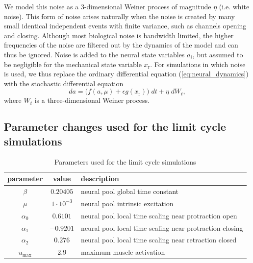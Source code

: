 We model this noise as a 3-dimensional Weiner process of magnitude $\eta$
(i.e. white noise).  This form of noise arises naturally when the noise is
created by many small identical independent events with finite variance,
such as channels opening and closing.  Although most biological noise is
bandwidth limited, the higher frequencies of the noise are filtered out by the
dynamics of the model and can thus be ignored.  Noise is added to the
neural state variables $a_i$, but assumed to be negligible for the mechanical
state variable $x_\textrm{r}$.  For simulations in which noise is used, we thus replace
the ordinary differential equation (\ref{eq:neural_dynamics}) with the stochastic
differential equation
\begin{equation}
\label{eq:noisy_neural_dynamics}
da = \bigl(f(a, \mu) + \epsilon g(x_\textrm{r})\bigr)\;dt + \eta\;dW_t,
\end{equation}
where $W_t$ is a three-dimensional Weiner process.

\subsection{Parameter changes used for the limit cycle simulations}

\ifthesis
\desccolwidth=100mm
\else
\desccolwidth=35mm
\fi
\begin{table}
\centering
\begin{tabular}{|c|c|p{\desccolwidth}|}
     \hline
     parameter & value & description \\
     \hline
     $\beta$ & $0.20405$ & neural pool global time constant \\
     $\mu$ & $1\cdot10^{-3}$ & neural pool intrinsic excitation \\%
     $\alpha_0$ & $0.6101$ & neural pool local time scaling near protraction open\\
     $\alpha_1$ & $-0.9201$ & neural pool local time scaling near protraction closing\\
     $\alpha_2$ & $0.276$ & neural pool local time scaling near retraction closed\\
     $u_\textrm{max}$ & 2.9 & maximum muscle activation \\
     \hline
\end{tabular}
\caption{Parameters used for the limit cycle simulations}
\label{table:limit_cycle_parameters}
\end{table}

